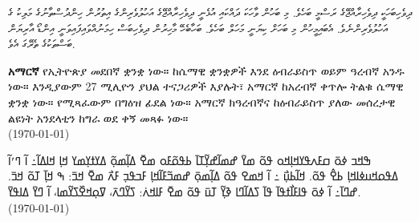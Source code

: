 \documentclass[a4paper]{article}
\begin{document}
\begin{divehi}\small\sloppy
  ދިވެހިބަހަކީ ދިވެހިރާއްޖޭގެ ރަސްމީ ބަހެވެ. މި ބަހުން ވާހަކަ ދައްކައި އުޅެނީ ދިވެހިރާއްޖޭގެ އަހުލުވެރިންގެ އިތުރުން ހިންދުސްތާނުގެ މަލިކު ގެ
  އަހުލުވެރިންނެވެ. އެބައިމީހުން މި ބަހަށް ކިޔަނީ މަހަލް ބަހެވެ. ބަހާބެހޭ މާހިރުން ދިވެހިބަސް ހިމަނުއްވައިފައިވަނީ އިންޑޯ އާރިޔަން ބަސްތަކުގެ
  ތެރޭގަ އެވެ.
\end{divehi}

%

\begin{amharic}
  \textbf{አማርኛ} የኢትዮጵያ መደበኛ ቋንቋ ነው። ከሴማዊ ቋንቋዎች እንደ ዕብራይስጥ ወይም ዓረብኛ አንዱ ነው። እንዲያውም 27 ሚሊዮን ያህል ተናጋሪዎች እያሉት፣ አማርኛ ከአረብኛ ቀጥሎ ትልቁ ሴማዊ ቋንቋ ነው። የሚጻፈውም በግዕዝ ፊደል ነው። አማርኛ ክዓረብኛና ከዕብራይስጥ ያለው መሰረታዊ ልዩነት አንደላቲን ከግራ ወደ ቀኝ መጻፉ ነው። \\
  (\today)
\end{amharic}

\begin{nko}
  ߒߞߏ ߦߋ߫ ߛߓߍߟߌߞߊ߲ߞߋ ߟߋ߬ ߘߌ߫ ߝߘߊ߬ߝߌ߲߬ߠߊ߫ ߕߟߋ߬ߓߋ ߘߐ߫ ߡߊ߲߬ߘߋ߲߬ ߡߌߙߌ߲ߘߌ ߞߊ߲ ߞߊߡߊ߬߸ ߊ߬ ߣߴߊ߬ ߡߟߋߞߎߦߊߞߊ߲ ߕߐ߮ ߟߋ߬. ߞߊ߬ߕߎ߲߯ ߸ ߊ߬ ߞߘߐ ߟߋ߬ ߡߊ߲߬ߘߋ߲߫ ߝߘߏ߬ߓߊ߬ߞߊ߲ ߓߏߟߏ߲ ߓߍ߯ ߘߐ߫ ߞߏ߫: ߒ ߞߊ߲߫ ߠߋ߬ ߞߏ߫. ߝߣߊ߫߸ ߊ߬ ߦߋ߫ ߟߊߓߊ߯ߙߟߊ߫ ߟߊ߫ ߖߡߊ߬ߣߊ ߢߌ߲߬ ߠߎ߫ ߟߋ߬ ߘߐ߫ ߓߊߞߍ߭: ߖߌ߬ߣߍ߫، ߜߋ߲ߞߐ߰ߖߌ߬ߘߊ، ߊ߬ ߣߌ߫ ߡߊߟߌ߫.
  \\
  (\today)
\end{nko}
\end{document}

